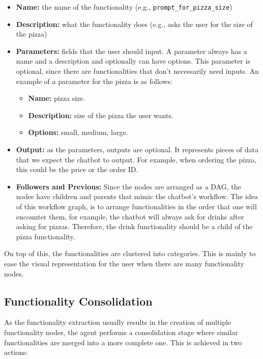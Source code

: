 \begin{itemize}
  \item \textbf{Name:} the name of the functionality (e.g., \texttt{prompt\_for\_pizza\_size})
  \item \textbf{Description:} what the functionality does (e.g., asks the user for the size of the pizza)
  \item \textbf{Parameters:} fields that the user should input.
    A parameter always has a name and a description
    and optionally can have options.
    This parameter is optional,
    since there are functionalities that don't necessarily need inputs.
    An example of a parameter for the pizza is as follows: 
    \begin{itemize}
      \item \textbf{Name:} pizza size.
      \item \textbf{Description:} size of the pizza the user wants.
      \item \textbf{Options:} small, medium, large.
    \end{itemize}
  \item \textbf{Output:} as the parameters, outputs are optional.
    It represents pieces of data that we expect the chatbot to output.
    For example, when ordering the pizza, this could be the price or the order ID.
  \item \textbf{Followers and Previous:}
    Since the nodes are arranged as a \ac{DAG},
    the nodes have children and parents that mimic the chatbot's workflow.
    The idea of this workflow graph,
    is to arrange functionalities in the order that one will encounter them,
    for example,
    the chatbot will always ask for drinks after asking for pizzas.
    Therefore, the drink functionality should be a child of the pizza functionality.
\end{itemize}

On top of this,
the functionalities are clustered into categories.
This is mainly to ease the visual representation for the user
when there are many functionality nodes.

\subsection{Functionality Consolidation}\label{subsec:functionality-consolidation}


As the functionality extraction usually results
in the creation of multiple functionality nodes,
the agent performs a consolidation stage where
similar functionalities are merged into a more complete one.
This is achieved in two actions:

